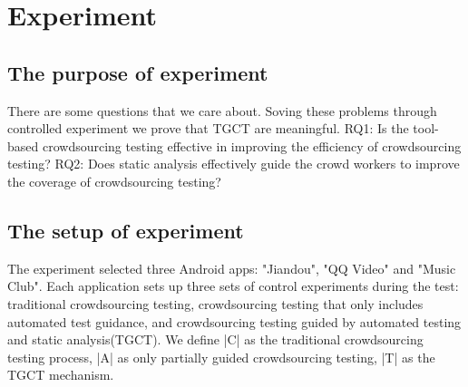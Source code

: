 \section{Experiment}

\subsection{The purpose of experiment}
There are some questions that we care about. Soving these problems through controlled experiment we prove that TGCT are meaningful. RQ1: Is the tool-based crowdsourcing testing effective in improving the efficiency of crowdsourcing testing? RQ2: Does static analysis effectively guide the crowd workers to improve the coverage of crowdsourcing testing? 

\subsection{The setup of experiment}
The experiment selected three Android apps: "Jiandou", "QQ Video" and "Music Club". Each application sets up three sets of control experiments during the test: traditional crowdsourcing testing, crowdsourcing testing that only includes automated test guidance, and crowdsourcing testing guided by automated testing and static analysis(TGCT). We define |C| as the traditional crowdsourcing testing process, |A| as only partially guided crowdsourcing testing, |T| as the TGCT mechanism.

